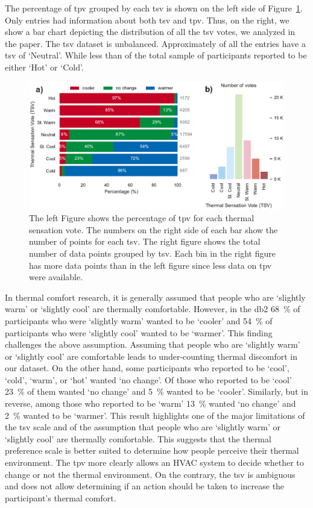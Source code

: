 The percentage of \ac{tpv} grouped by each \ac{tsv} is shown on the left side of Figure~\ref{fig:bar_plot_tp_by_ts}.
Only  entries had information about both \ac{tsv} and \ac{tpv}.
Thus, on the right, we show a bar chart depicting the distribution of all the \ac{tsv} votes, we analyzed in the paper.
The \ac{tsv} dataset is unbalanced.
Approximately  of all the entries have a \ac{tsv} of `Neutral'.
While less than  of the total sample of participants reported to be either `Hot' or `Cold'.
\begin{figure}[htb!]
    \centering
    \includegraphics[width=\textwidth]{figures/bar_plot_tp_by_ts}
    \caption{The left Figure shows the percentage of \ac{tpv} for each thermal sensation vote.
    The numbers on the right side of each bar show the number of points for each \ac{tsv}.
    The right figure shows the total number of data points grouped by \ac{tsv}.
    Each bin in the right figure has more data points than in the left figure since less data on \ac{tpv} were available.}
    \label{fig:bar_plot_tp_by_ts}
\end{figure}

In thermal comfort research, it is generally assumed that people who are `slightly warm' or `slightly cool' are thermally comfortable.
However, in the \ac{db2} \qty{68}{\percent} of participants who were `slightly warm' wanted to be `cooler' and \qty{54}{\percent} of participants who were `slightly cool' wanted to be `warmer'.
This finding challenges the above assumption.
Assuming that people who are `slightly warm' or `slightly cool' are comfortable leads to under-counting thermal discomfort in our dataset.
On the other hand, some participants who reported to be `cool', `cold', `warm', or `hot' wanted `no change'.
Of those who reported to be `cool' \qty{23}{\percent} of them wanted `no change' and \qty{5}{\percent} wanted to be `cooler'.
Similarly, but in reverse, among those who reported to be `warm' \qty{13}{\percent} wanted `no change' and \qty{2}{\percent} wanted to be `warmer'.
This result highlights one of the major limitations of the \ac{tsv} scale and of the assumption that people who are `slightly warm' or `slightly cool' are thermally comfortable.
This suggests that the thermal preference scale is better suited to determine how people perceive their thermal environment.
The \ac{tpv} more clearly allows an HVAC system to decide whether to change or not the thermal environment. 
On the contrary, the \ac{tsv} is ambiguous and does not allow determining if an action should be taken to increase the participant's thermal comfort.

